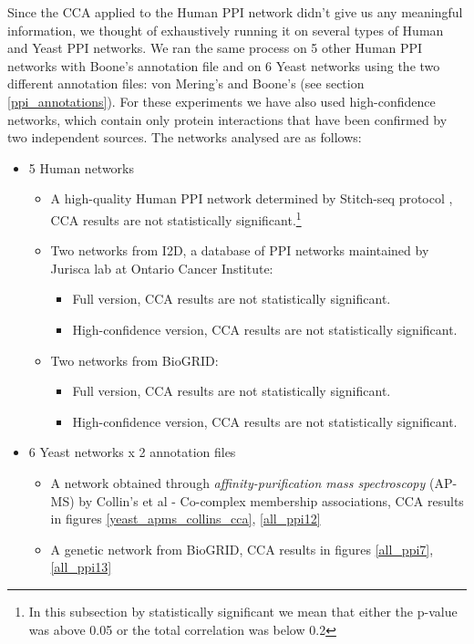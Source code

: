 Since the CCA applied to the Human PPI network didn't give us any meaningful information, we thought of exhaustively running it on several types of Human and Yeast PPI networks. We ran the same process on 5 other Human PPI networks with Boone's annotation file and on 6 Yeast networks using the two different annotation files: von Mering's and Boone's (see section \ref{ppi_annotations}). For these experiments we have also used high-confidence networks, which contain only protein interactions that have been confirmed by two independent sources. The networks analysed are as follows:
\begin{itemize}
 \item 5 Human networks
 \begin{itemize}
    \item A high-quality Human PPI network determined by Stitch-seq protocol \cite{yu2011next}, CCA results are not statistically significant.\footnote{In this subsection by statistically significant we mean that either the p-value was above 0.05 or the total correlation was below 0.2}
    \item Two networks from I2D, a database of PPI networks maintained by Jurisca lab \cite{brown2007unequal} at Ontario Cancer Institute:
    \begin{itemize}
      \item Full version, CCA results are not statistically significant.
      \item High-confidence version, CCA results are not statistically significant.
    \end{itemize}
    \item Two networks from BioGRID: 
    \begin{itemize}
      \item Full version, CCA results are not statistically significant.
      \item High-confidence version, CCA results are not statistically significant.
    \end{itemize}
  \end{itemize}
 \item 6 Yeast networks x 2 annotation files
  \begin{itemize}
    \item A network obtained through \emph{affinity-purification mass spectroscopy} (AP-MS) by Collin's et al \cite{collins2007toward} - Co-complex membership associations, CCA results in figures  \ref{yeast_apms_collins_cca}, \ref{all_ppi12}
    \item A genetic network from BioGRID, CCA results in figures   \ref{all_ppi7}, \ref{all_ppi13}

\end{itemize}
\end{itemize}
